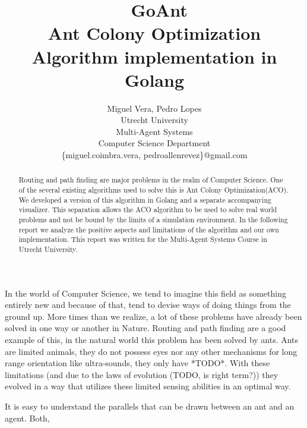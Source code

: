 \documentclass[times, 10pt,twocolumn]{article}
\begin{document}
\title{\ GoAnt\\ Ant Colony Optimization Algorithm implementation in Golang}

			 \author{Miguel Vera, Pedro Lopes\\
				 Utrecht University\\ Multi-Agent Systems \\
                 Computer Science Department\\  
                 \{miguel.coimbra.vera,
				 pedroallenrevez\}@gmail.com }

\maketitle \thispagestyle{empty}

\begin{abstract} 
		Routing and path finding are major problems in the realm of Computer Science. One
	of the several existing algorithms used to solve this is Ant Colony Optimization(ACO). We 
	developed a version of this algorithm in Golang and a separate accompanying visualizer.
	This separation allows the ACO algorithm to be used to solve real world problems and 
	not be bound by the limits of a simulation environment. In the following report we 
	analyze the positive aspects and limitations of the algorithm and our own implementation.
    This report was written for the Multi-Agent Systems Course in Utrecht University.
\end{abstract}

		In the world of Computer Science, we tend to imagine this field as something entirely
	new and because of that, tend to devise ways of doing things from the ground up. More 
	times than we realize, a lot of these problems have already been solved in one way or
	another in Nature. Routing and path finding are a good example of this, in the natural 
	world this problem has been solved by ants. Ants are limited animals, they do not possess
	eyes nor any other mechanisms for long range orientation like ultra-sounds, they only
	have *TODO*. With these limitations (and due to the laws of evolution (TODO, is right term?)) they 
	evolved in a way that utilizes these limited sensing abilities in an optimal way.
	
	    It is easy to understand the parallels that can be drawn between an ant and an agent.    Both,
	
\end{document}
